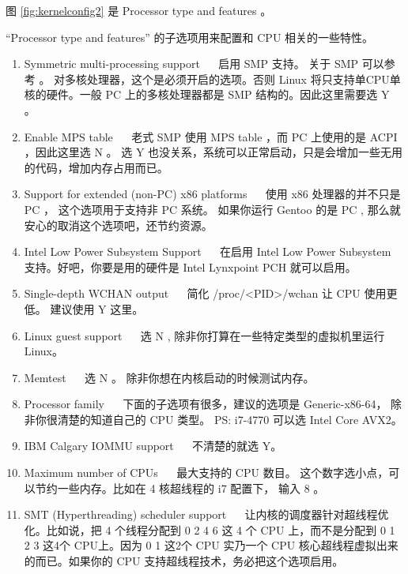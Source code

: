 图 \ref{fig:kernelconfig2} 是 Processor type and features 。



“Processor type and features” 的子选项用来配置和 CPU 相关的一些特性。

\begin{enumerate}

\item 
Symmetric multi-processing support ~~ 启用  SMP 支持。 关于 SMP 可以参考 。 对多核处理器，这个是必须开启的选项。否则 Linux 将只支持单CPU单核的硬件。一般 PC 上的多核处理器都是 SMP 结构的。因此这里需要选 Y 。

\item Enable MPS table ~~ 老式 SMP 使用  MPS table ，而 PC 上使用的是 ACPI ，因此这里选 N 。 选 Y 也没关系，系统可以正常启动，只是会增加一些无用的代码，增加内存占用而已。

\item Support for extended (non-PC) x86 platforms ~~ 使用 x86 处理器的并不只是 PC ， 这个选项用于支持非 PC 系统。 如果你运行 Gentoo 的是 PC , 那么就安心的取消这个选项吧，还节约资源。

\item Intel Low Power Subsystem Support ~~ 在启用 Intel Low Power Subsystem 支持。好吧，你要是用的硬件是 
Intel Lynxpoint PCH 就可以启用。

\item Single-depth WCHAN output ~~ 简化 /proc/<PID>/wchan 让 CPU 使用更低。 建议使用  Y 这里。

\item Linux guest support ~~ 选 N , 除非你打算在一些特定类型的虚拟机里运行 Linux。

\item Memtest ~~ 选 N 。 除非你想在内核启动的时候测试内存。

\item Processor family ~~ 下面的子选项有很多，建议的选项是 Generic-x86-64， 除非你很清楚的知道自己的  CPU 类型。 PS: i7-4770 可以选 Intel Core AVX2。 

\item IBM Calgary IOMMU support ~~ 不清楚的就选 Y。

\item Maximum number of CPUs ~~ 最大支持的 CPU 数目。 这个数字选小点，可以节约一些内存。比如在 4 核超线程的 i7 配置下， 输入 8 。

\item SMT (Hyperthreading) scheduler support ~~ 让内核的调度器针对超线程优化。比如说，把 4 个线程分配到 0 2 4 6 这 4 个 CPU 上，而不是分配到 0 1 2 3 这4个 CPU上。因为 0 1 这2个 CPU 实乃一个 CPU 核心超线程虚拟出来的而已。如果你的 CPU 支持超线程技术，务必把这个选项启用。


\end{enumerate}
